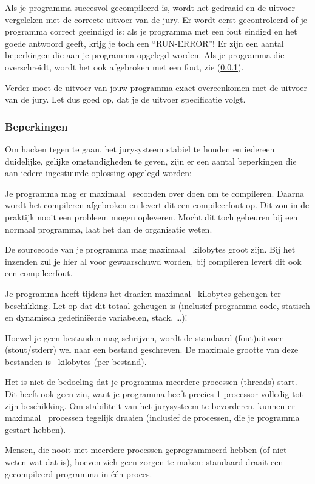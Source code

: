 \documentclass[11pt,titlepage,a4paper]{article}
\begin{document}
Als je programma succesvol gecompileerd is, wordt het gedraaid en de
uitvoer vergeleken met de correcte uitvoer van de jury. Er wordt eerst
gecontroleerd of je programma correct geeindigd is: als je programma
met een fout eindigd en het goede antwoord geeft, krijg je toch een
``RUN-ERROR''! Er zijn een aantal beperkingen die aan je programma
opgelegd worden. Als je programma die overschreidt, wordt het ook
afgebroken met een fout, zie (\ref{runlimits}).

Verder moet de uitvoer van jouw programma exact overeenkomen met de
uitvoer van de jury. Let dus goed op, dat je de uitvoer specificatie
volgt.

\subsubsection{Beperkingen}\label{runlimits}

Om hacken tegen te gaan, het jurysysteem stabiel te houden en iedereen
duidelijke, gelijke omstandigheden te geven, zijn er een aantal
beperkingen die aan iedere ingestuurde oplossing opgelegd worden:

\begin{description}
\item[compile-tijd]
Je programma mag er maximaal \COMPILETIME\ seconden over doen om te
compileren. Daarna wordt het compileren afgebroken en levert dit een
compileerfout op. Dit zou in de praktijk nooit een probleem mogen
opleveren. Mocht dit toch gebeuren bij een normaal programma, laat het
dan de organisatie weten.

\item[source grootte]
De sourcecode van je programma mag maximaal \SOURCESIZE\ kilobytes
groot zijn. Bij het inzenden zul je hier al voor gewaarschuwd worden,
bij compileren levert dit ook een compileerfout.

\item[geheugen]
Je programma heeft tijdens het draaien maximaal \MEMLIMIT\ kilobytes
geheugen ter beschikking. Let op dat dit totaal geheugen is (inclusief
programma code, statisch en dynamisch gedefini\"eerde variabelen,
stack, \dots)!

\item[bestandsgrootte]
Hoewel je geen bestanden mag schrijven, wordt de standaard (fout)uitvoer
(stout/stderr) wel naar een bestand geschreven. De maximale grootte
van deze bestanden is \FILELIMIT\ kilobytes (per bestand).

\item[aantal processen]
Het is niet de bedoeling dat je programma meerdere processen (threads)
start. Dit heeft ook geen zin, want je programma heeft precies 1
processor volledig tot zijn beschikking. Om stabiliteit van het
jurysysteem te bevorderen, kunnen er maximaal \PROCLIMIT\ processen
tegelijk draaien (inclusief de processen, die je programma gestart
hebben).

Mensen, die nooit met meerdere processen geprogrammeerd hebben (of
niet weten wat dat is), hoeven zich geen zorgen te maken: standaard
draait een gecompileerd programma in \'e\'en proces.

\end{description}
\end{document}

